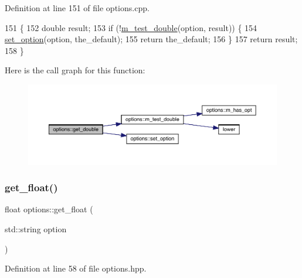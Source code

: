 Definition at line 151 of file options.\+cpp.


\begin{DoxyCode}
151                                                                \{
152   \textcolor{keywordtype}{double} result;
153   \textcolor{keywordflow}{if} (!\hyperlink{classoptions_a0eebdb8dbce454720ef9251fcd7abf24}{m\_test\_double}(option, result)) \{
154     \hyperlink{classoptions_a3c23831e4218f9a88cddc81337518046}{set\_option}(option, the\_default);
155     \textcolor{keywordflow}{return} the\_default;
156   \}
157   \textcolor{keywordflow}{return} result;
158 \}
\end{DoxyCode}
Here is the call graph for this function\+:\nopagebreak
\begin{figure}[H]
\begin{center}
\leavevmode
\includegraphics[width=350pt]{classoptions_aa78e7d95dc59a2d25987546cdbab7872_cgraph}
\end{center}
\end{figure}
\mbox{\label{classoptions_a31607533d0c6d2fa331f4e7f52d34bc8}} 
\subsubsection{\texorpdfstring{get\+\_\+float()}{get\_float()}\hspace{0.1cm}{\footnotesize\ttfamily [1/2]}}
{\footnotesize\ttfamily float options\+::get\+\_\+float (\begin{DoxyParamCaption}\item[{std\+::string}]{option }\end{DoxyParamCaption})\hspace{0.3cm}{\ttfamily [inline]}}



Definition at line 58 of file options.\+hpp.


